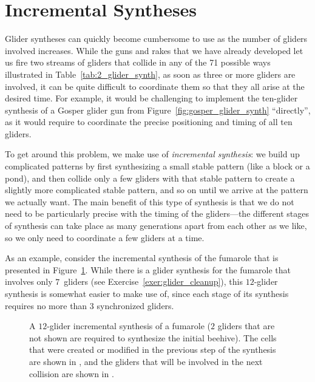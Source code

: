 \section{Incremental Syntheses}\label{sec:incremental_synthesis}

Glider syntheses can quickly become cumbersome to use as the number of gliders involved increases. While the guns and rakes that we have already developed let us fire two streams of gliders that collide in any of the 71 possible ways illustrated in Table~\ref{tab:2_glider_synth}, as soon as three or more gliders are involved, it can be quite difficult to coordinate them so that they all arise at the desired time. For example, it would be challenging to implement the ten-glider synthesis of a Gosper glider gun from Figure~\ref{fig:gosper_glider_synth} ``directly'', as it would require to coordinate the precise positioning and timing of all ten gliders.

To get around this problem, we make use of \emph{incremental synthesis}: we build up complicated patterns by first synthesizing a small stable pattern (like a block or a pond), and then collide only a few gliders with that stable pattern to create a slightly more complicated stable pattern, and so on until we arrive at the pattern we actually want. The main benefit of this type of synthesis is that we do not need to be particularly precise with the timing of the gliders---the different stages of synthesis can take place as many generations apart from each other as we like, so we only need to coordinate a few gliders at a time.

As an example, consider the incremental synthesis of the fumarole that is presented in Figure~\ref{fig:fumarole_sequential}. While there is a glider synthesis for the fumarole that involves only $7$~gliders (see Exercise~\ref{exer:glider_cleanup}), this $12$-glider synthesis is somewhat easier to make use of, since each stage of its synthesis requires no more than $3$ synchronized gliders.

\begin{figure}[!htb]
	\centering{}
	\caption{A $12$-glider incremental synthesis of a fumarole ($2$ gliders that are not shown are required to synthesize the initial beehive). The cells that were created or modified in the previous step of the synthesis are shown in , and the gliders that will be involved in the next collision are shown in .}\label{fig:fumarole_sequential}
\end{figure}

